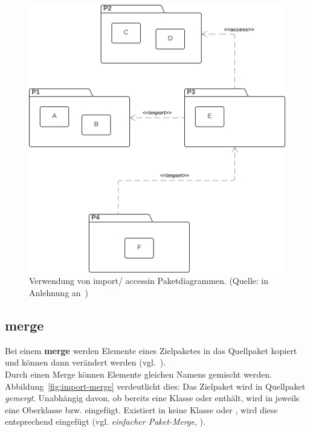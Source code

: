 \begin{figure}
    \centering
    \includegraphics[scale=0.4]{part three/Klassendiagramme - Erweiterte Konzepte und Paketdiagramme/img/import-access}
    \caption{Verwendung von \guillemotleft import\guillemotright / \guillemotleft access\guillemotright in Paketdiagrammen. (Quelle: in Anlehnung an~\cite[308, Abb. 6.8-3]{Bal05})}
    \label{fig:import-access}
\end{figure}

\subsection{\guillemotleft merge\guillemotright}
Bei einem \textbf{merge} werden Elemente eines Zielpaketes in das Quellpaket kopiert und können dann verändert werden (vgl.~\cite[307]{Bal05}).\\
Durch einen Merge können Elemente gleichen Namens gemischt werden.
Abbildung~\ref{fig:import-merge} verdeutlicht dies: Das Zielpaket  wird in Quellpaket  \textit{gemergt}.
Unabhängig davon, ob  bereits eine Klasse  oder  enthält, wird in  jeweils eine Oberklasse  bzw.  eingefügt.
Existiert in  keine Klasse  oder , wird diese entsprechend eingefügt (vgl. \textit{einfacher Paket-Merge}, \cite[308]{Bal05}).


